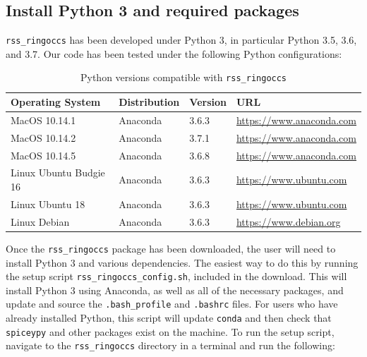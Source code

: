 \documentclass[titlepage, 12pt]{article}
\begin{document}
        \subsection{Install Python 3 and required packages}
            \texttt{rss\_ringoccs} has been developed under Python 3,
            in particular Python 3.5, 3.6, and 3.7.
            Our code has been tested under the following
            Python configurations:
            \begin{table}[H]
                \centering
                \begin{tabular}{|l|l|l|l|}
                    \hline
                    Operating System&Distribution&
                    Version&URL\\
                    \hline
                    MacOS 10.14.1&Anaconda&
                    3.6.3&\url{https://www.anaconda.com}\\
                    MacOS 10.14.2&Anaconda&
                    3.7.1&\url{https://www.anaconda.com}\\
                    MacOS 10.14.5&Anaconda&
                    3.6.8&\url{https://www.anaconda.com}\\
                    Linux Ubuntu Budgie 16&Anaconda&
                    3.6.3&\url{https://www.ubuntu.com}\\
                    Linux Ubuntu 18&Anaconda&3.6.3&
                    \url{https://www.ubuntu.com}\\
                    Linux Debian &Anaconda&
                    3.6.3&\url{https://www.debian.org}\\
                    \hline
                \end{tabular}
                \caption{Python versions compatible with
                         \texttt{rss\_ringoccs}}
                \label{tab:Python}
            \end{table}
            Once the  \texttt{rss\_ringoccs} package has been downloaded,
            the user will need to install Python 3 and
            various dependencies. The easiest way to do this by running
            the setup script
            \texttt{rss\_ringoccs\_config.sh},
            included in the download. This will install
            Python 3 using Anaconda, as well as all of the necessary
            packages, and update and source the \texttt{.bash\_profile} 
            and \texttt{.bashrc} files. For users who have already installed Python,
            this script will update \texttt{conda} and then check that
            \texttt{spiceypy} and other packages exist on the machine. To run the setup script, navigate to the \texttt{rss\_ringoccs} directory in a terminal and run the following:
\end{document}
